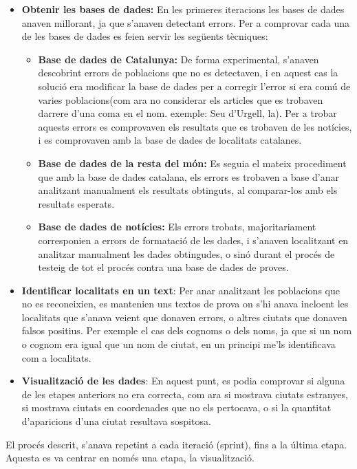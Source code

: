\documentclass[12pt,a4paper,openright,oneside]{article}
\numberwithin{equation}{section}
\theoremstyle{definition}
\begin{document}
\begin{itemize}
\item \textbf{Obtenir les bases de dades:} En les primeres iteracions les bases de dades anaven millorant, ja que s'anaven detectant errors. Per a comprovar cada una de les bases de dades es feien servir les següents tècniques:
\begin{itemize}
\item \textbf{Base de dades de Catalunya:} De forma experimental, s'anaven descobrint errors de poblacions que no es detectaven, i en aquest cas la solució era modificar la base de dades per a corregir l'error si era comú de varies poblacions(com ara no considerar els articles que es trobaven darrere d'una coma en el nom. exemple: Seu d'Urgell, la). Per a trobar aquests errors es comprovaven els resultats que es trobaven de les notícies, i es comprovaven amb la base de dades de localitats catalanes.
\item \textbf{Base de dades de la resta del món:} Es seguia el mateix procediment que amb la base de dades catalana, els errors es trobaven a base d'anar analitzant manualment els resultats obtinguts, al comparar-los amb els resultats esperats.
\item\textbf{ Base de dades de notícies:} Els errors trobats, majoritariament corresponien a errors de formatació de les dades, i s'anaven localitzant en analitzar manualment les dades obtingudes, o sinó durant el procés de testeig de tot el procés contra una base de dades de proves.
\end{itemize}
\item \textbf{Identificar localitats en un text}: Per anar analitzant les poblacions que no es reconeixien, es mantenien uns textos de prova on s'hi anava incloent les localitats que s'anava veient que donaven errors, o altres ciutats que donaven falsos positius. Per exemple el cas dels cognoms o dels noms, ja que si un nom o cognom era igual que un nom de ciutat, en un principi me'ls identificava com a localitats. 
\item \textbf{Visualització de les dades}: En aquest punt, es podia comprovar si alguna de les etapes anteriors no era correcta, com ara si mostrava ciutats estranyes, si mostrava ciutats en coordenades que no els pertocava, o si la quantitat d'aparicions d'una ciutat resultava sospitosa.
\end{itemize}

El procés descrit, s'anava repetint a cada iteració (sprint), fins a la última etapa. Aquesta es va centrar en només una etapa, la visualització.
\end{document}
